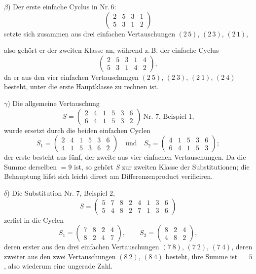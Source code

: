 \documentclass[11pt]{article}
\providecommand{\weberpage}[1]{}
\begin{document}
$\beta$) Der erste einfache Cyclus in Nr.\,6:
\[
\begin{pmatrix} 2 & 5 & 3 & 1 \\ 5 & 3 & 1 & 2 \end{pmatrix}
\]
setzte sich zusammen aus drei einfachen Vertauschungen $(2\,5)$, $(2\,3)$, $(2\,1)$,


\weberpage{13}
also gehört er der zweiten Klasse an, während z.\,B. der einfache Cyclus
\[
\begin{pmatrix} 2 & 5 & 3 & 1 & 4 \\ 5 & 3 & 1 & 4 & 2 \end{pmatrix},
\]
da er aus den vier einfachen Vertauschungen $(2\ 5)$, $(2\ 3)$, $(2\ 1)$, $(2\ 4)$ besteht, unter die erste Hauptklasse zu rechnen ist.

$\gamma$) Die allgemeine Vertauschung
\[
S = \begin{pmatrix} 2 & 4 & 1 & 5 & 3 & 6 \\ 6 & 4 & 1 & 5 & 3 & 2 \end{pmatrix} \ \text{Nr. 7, Beispiel 1,}
\]
wurde ersetzt durch die beiden einfachen Cyclen
\[
S_1 = \begin{pmatrix} 2 & 4 & 1 & 5 & 3 & 6 \\ 4 & 1 & 5 & 3 & 6 & 2 \end{pmatrix} \quad \text{und} \quad S_2 = \begin{pmatrix} 4 & 1 & 5 & 3 & 6 \\ 6 & 4 & 1 & 5 & 3 \end{pmatrix};
\]
der erste besteht aus fünf, der zweite aus vier einfachen Vertauschungen. Da die Summe derselben $= 9$ ist, so gehört $S$ zur zweiten Klasse der Substitutionen; die Behauptung läfst sich leicht direct am Differenzenproduct verificiren.

$\delta$) Die Substitution Nr. 7, Beispiel 2,
\[
S = \begin{pmatrix} 5 & 7 & 8 & 2 & 4 & 1 & 3 & 6 \\ 5 & 4 & 8 & 2 & 7 & 1 & 3 & 6 \end{pmatrix}
\]
zerfiel in die Cyclen
\[
S_1 = \begin{pmatrix} 7 & 8 & 2 & 4 \\ 8 & 2 & 4 & 7 \end{pmatrix}, \qquad S_2 = \begin{pmatrix} 8 & 2 & 4 \\ 4 & 8 & 2 \end{pmatrix},
\]
deren erster aus den drei einfachen Vertauschungen $(7\ 8)$, $(7\ 2)$, $(7\ 4)$, deren zweiter aus den zwei Vertauschungen $(8\ 2)$, $(8\ 4)$ besteht, ihre Summe ist $= 5$, also wiederum eine ungerade Zahl.
\end{document}
